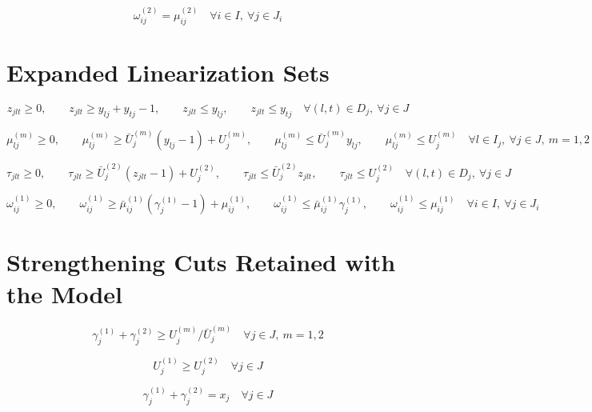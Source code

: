 \documentclass{article}
\begin{document}
\begin{equation}
\omega_{ij}^{(2)} = \mu_{ij}^{(2)}
\quad \forall i \in I,\ \forall j \in J_i
\tag{13i}
\end{equation}

\section*{Expanded Linearization Sets}
\begin{equation}
z_{jlt} \ge 0,\qquad
z_{jlt} \ge y_{lj} + y_{tj} - 1,\qquad
z_{jlt} \le y_{lj},\qquad
z_{jlt} \le y_{tj}
\quad \forall (l,t)\in D_j,\ \forall j \in J
\tag{Lin-F}
\end{equation}

\begin{equation}
\mu_{lj}^{(m)} \ge 0,\qquad
\mu_{lj}^{(m)} \ge \bar U_j^{(m)}(y_{lj}-1) + U_j^{(m)},\qquad
\mu_{lj}^{(m)} \le \bar U_j^{(m)} y_{lj},\qquad
\mu_{lj}^{(m)} \le U_j^{(m)}
\quad \forall l \in I_j,\ \forall j \in J,\ m=1,2
\tag{Lin-mu}
\end{equation}

\begin{equation}
\tau_{jlt} \ge 0,\qquad
\tau_{jlt} \ge \bar U_j^{(2)}(z_{jlt}-1) + U_j^{(2)},\qquad
\tau_{jlt} \le \bar U_j^{(2)} z_{jlt},\qquad
\tau_{jlt} \le U_j^{(2)}
\quad \forall (l,t)\in D_j,\ \forall j \in J
\tag{Lin-tau}
\end{equation}

\begin{equation}
\omega_{ij}^{(1)} \ge 0,\qquad
\omega_{ij}^{(1)} \ge \bar\mu_{ij}^{(1)}(\gamma_j^{(1)}-1) + \mu_{ij}^{(1)},\qquad
\omega_{ij}^{(1)} \le \bar\mu_{ij}^{(1)} \gamma_j^{(1)},\qquad
\omega_{ij}^{(1)} \le \mu_{ij}^{(1)}
\quad \forall i \in I,\ \forall j \in J_i
\tag{Lin-omega}
\end{equation}

\section*{Strengthening Cuts Retained with the Model}
\begin{equation}
\gamma_j^{(1)} + \gamma_j^{(2)} \ge U_j^{(m)} / \bar U_j^{(m)}
\quad \forall j \in J,\ m=1,2
\tag{20}
\end{equation}

\begin{equation}
U_j^{(1)} \ge U_j^{(2)}
\quad \forall j \in J
\tag{21}
\end{equation}

\begin{equation}
\gamma_j^{(1)} + \gamma_j^{(2)} = x_j
\quad \forall j \in J
\tag{22}
\end{equation}
\end{document}
